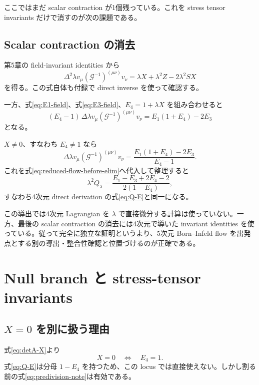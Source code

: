 \documentclass[a4paper,11pt]{ltjsreport}
\newcommand{\G}{\mathcal G}
\begin{document}
ここではまだ scalar contraction が1個残っている。これを stress tensor invariants だけで消すのが次の課題である。

\section{Scalar contraction の消去}

第5章の field-invariant identities から
\begin{equation}
 \Delta^2\lambda v_\mu(\G^{-1})^{(\mu\nu)}v_\nu
 =\lambda X+\lambda^2Z-2\lambda^2SX
 \label{eq:Rphi-field}
\end{equation}
を得る。この式自体も付録で direct inverse を使って確認する。

一方、式\eqref{eq:E1-field}、式\eqref{eq:E3-field}、$E_4=1+\lambda X$ を組み合わせると
\begin{equation}
 (E_4-1)\,
 \Delta\lambda v_\mu(\G^{-1})^{(\mu\nu)}v_\nu
 =E_1(1+E_4)-2E_3
 \label{eq:elimination-identity}
\end{equation}
となる。

$X\neq0$、すなわち $E_4\neq1$ なら
\begin{equation}
 \Delta\lambda v_\mu(\G^{-1})^{(\mu\nu)}v_\nu
 =\frac{E_1(1+E_4)-2E_3}{E_4-1}.
 \label{eq:contraction-eliminated}
\end{equation}
これを式\eqref{eq:reduced-flow-before-elim}へ代入して整理すると
\begin{equation}
 \lambda^2Q_\lambda
 =\frac{E_1-E_3+2E_4-2}{2(1-E_4)},
\end{equation}
すなわち4次元 direct derivation の式\eqref{eq:Q-E}と同一になる。

この導出では4次元 Lagrangian を $\lambda$ で直接微分する計算は使っていない。一方、最後の scalar contraction の消去には4次元で導いた invariant identities を使っている。従って完全に独立な証明というより、5次元 Born--Infeld flow を出発点とする別の導出・整合性確認と位置づけるのが正確である。

\chapter{Null branch と stress-tensor invariants}

\section{\texorpdfstring{$X=0$ を別に扱う理由}{X=0 を別に扱う理由}}

式\eqref{eq:detA-X}より
\begin{equation}
 X=0\quad\Longleftrightarrow\quad E_4=1.
\end{equation}
式\eqref{eq:Q-E}は分母 $1-E_4$ を持つため、この locus では直接使えない。しかし割る前の式\eqref{eq:predivision-note}は有効である。
\end{document}
